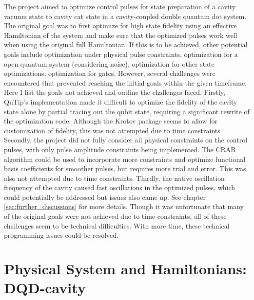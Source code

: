 \documentclass[12pt]{report}
\begin{document}
The project aimed to optimize control pulses for state preparation of a cavity vacuum state to cavity cat state in a cavity-coupled double quantum dot system.
The original goal was to first optimize for high state fidelity using an effective Hamiltonian of the system and make sure that the optimized pulses work well when using the original full Hamiltonian.
If this is to be achieved, other potential goals include optimization under physical pulse constraints, optimization for a open quantum system (considering noise), optimization for other state optimizations, optimization for gates.
However, several challenges were encountered that prevented reaching the initial goals within the given timeframe. Here I list the goals not achieved and outline the challenges faced.
Firstly, QuTip's implementation made it difficult to optimize the fidelity of the cavity state alone by partial tracing out the qubit state, requiring a significant rewrite of the optimization code. 
Although the Krotov package seems to allow for customization of fidelity, this was not attempted due to time constraints. 
Secondly, the project did not fully consider all physical constraints on the control pulses, with only pulse amplitude constraints being implemented. 
The CRAB algorithm could be used to incorporate more constraints and optimize functional basis coefficients for smoother pulses, but requires more trial and error. This was also not attempted due to time constraints.
Thirdly, the native oscillation frequency of the cavity caused fast oscillations in the optimized pulses, which could potentially be addressed but issues also came up. See chapter \ref{sec:further_discussions} for more details.
Though it was unfortunate that many of the original goals were not achieved due to time constraints, all of these challenges seem to be technical difficulties. 
With more time, these technical programming issues could be resolved.

\chapter{Physical System and Hamiltonians: DQD-cavity}
\end{document}
